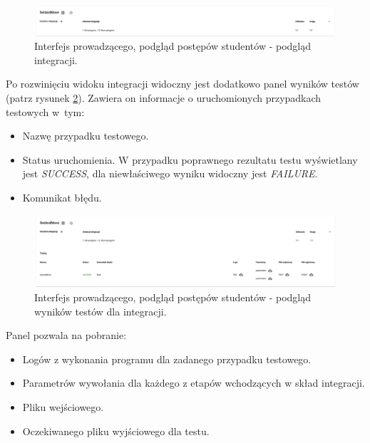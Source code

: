 \begin{figure}[h]
    \centering
    \includegraphics[width = 13cm]{chapter04/lecturer_preview_integration.png}
    \caption{Interfejs prowadzącego, podgląd postępów studentów - podgląd integracji.}
    \label{fig:lecturer-preview-integration}
\end{figure}

Po rozwinięciu widoku integracji widoczny jest dodatkowo panel wyników testów (patrz rysunek \ref{fig:lecturer-preview-integration-tests}).
Zawiera on informacje o uruchomionych przypadkach testowych w~tym:
\begin{itemize}
    \item Nazwę przypadku testowego.
    \item Status uruchomienia. W przypadku poprawnego rezultatu testu wyświetlany jest \textit{SUCCESS}, dla niewłaściwego wyniku widoczny jest \textit{FAILURE}.
    \item Komunikat błędu.
\end{itemize}

\begin{figure}[h]
    \centering
    \includegraphics[width = 13cm]{chapter04/lecturer_preview_integration_tests.png}
    \caption{Interfejs prowadzącego, podgląd postępów studentów - podgląd wyników testów dla integracji.}
    \label{fig:lecturer-preview-integration-tests}
\end{figure}

Panel pozwala na pobranie:
\begin{itemize}
    \item Logów z wykonania programu dla zadanego przypadku testowego.
    \item Parametrów wywołania dla każdego z etapów wchodzących w skład integracji.
    \item Pliku wejściowego.
    \item Oczekiwanego pliku wyjściowego dla testu.
\end{itemize}


